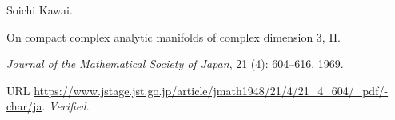 Soichi Kawai.

\newblock On compact complex analytic manifolds of complex dimension 3, {II}.

\newblock \emph{Journal of the Mathematical Society of Japan}, 21
  (4): 604--616, 1969.

\newblock URL
  \url{https://www.jstage.jst.go.jp/article/jmath1948/21/4/21_4_604/_pdf/-char/ja}.
\newblock \emph{Verified}.